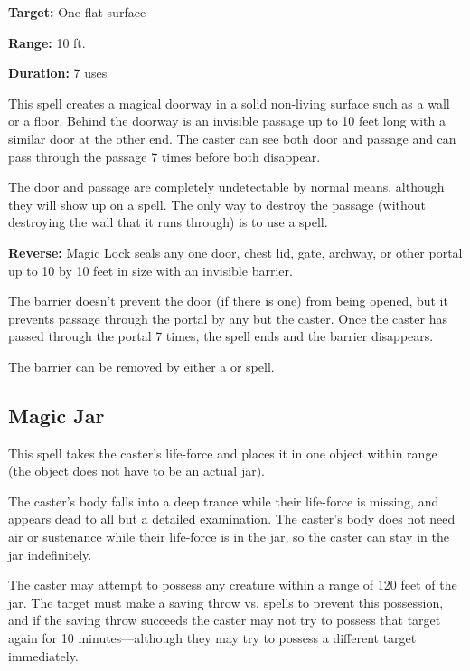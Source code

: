 \begin{multicols*}{2}
{\textbf{Target:} One flat surface

\textbf{Range:} 10 ft.

\textbf{Duration:} 7 uses}

This spell creates a magical doorway in a solid non-living surface such as a wall or a floor. Behind the doorway is an invisible passage up to 10 feet long with a similar door at the other end. The caster can see both door and passage and can pass through the passage 7 times before both disappear.

The door and passage are completely undetectable by normal means, although they will show up on a  spell. The only way to destroy the passage (without destroying the wall that it runs through) is to use a  spell.

\textbf{Reverse:} \hypertarget{spell:Magic Lock}{Magic Lock} seals any one door, chest lid, gate, archway, or other portal up to 10 by 10 feet in size with an invisible barrier.

The barrier doesn’t prevent the door (if there is one) from being opened, but it prevents passage through the portal by any but the caster. Once the caster has passed through the portal 7 times, the spell ends and the barrier disappears.

The barrier can be removed by either a  or  spell.

\subsection{Magic Jar}\label{spell:Magic Jar}

This spell takes the caster’s life-force and places it in one object within range (the object does not have to be an actual jar).

The caster’s body falls into a deep trance while their life-force is missing, and appears dead to all but a detailed examination. The caster’s body does not need air or sustenance while their life-force is in the jar, so the caster can stay in the jar indefinitely.

The caster may attempt to possess any creature within a range of 120 feet of the jar. The target must make a saving throw vs. spells to prevent this possession, and if the saving throw succeeds the caster may not try to possess that target again for 10 minutes—although they may try to possess a different target immediately.


\end{multicols*}
